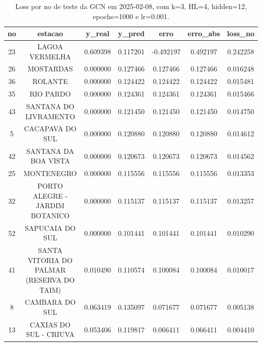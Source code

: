 \begin{table}[h]
\centering
\caption{Loss por no de teste da GCN em 2025-02-08, com k=3, HL=4, hidden=12, epochs=1000 e lr=0.001.}
\label{tab:gcn_loss_k3_hl4_h12_e1000_d20250208}
\begin{tabular}{ccccccc}
\toprule
no & estacao & y\_real & y\_pred & erro & erro\_abs & loss\_no \\
\midrule
23 & LAGOA VERMELHA & 0.609398 & 0.117201 & -0.492197 & 0.492197 & 0.242258 \\
26 & MOSTARDAS & 0.000000 & 0.127466 & 0.127466 & 0.127466 & 0.016248 \\
36 & ROLANTE & 0.000000 & 0.124422 & 0.124422 & 0.124422 & 0.015481 \\
35 & RIO PARDO & 0.000000 & 0.124361 & 0.124361 & 0.124361 & 0.015466 \\
43 & SANTANA DO LIVRAMENTO & 0.000000 & 0.121450 & 0.121450 & 0.121450 & 0.014750 \\
5 & CACAPAVA DO SUL & 0.000000 & 0.120880 & 0.120880 & 0.120880 & 0.014612 \\
42 & SANTANA DA BOA VISTA & 0.000000 & 0.120673 & 0.120673 & 0.120673 & 0.014562 \\
25 & MONTENEGRO & 0.000000 & 0.115556 & 0.115556 & 0.115556 & 0.013353 \\
32 & PORTO ALEGRE - JARDIM BOTANICO & 0.000000 & 0.115137 & 0.115137 & 0.115137 & 0.013257 \\
52 & SAPUCAIA DO SUL & 0.000000 & 0.101441 & 0.101441 & 0.101441 & 0.010290 \\
41 & SANTA VITORIA DO PALMAR (RESERVA DO TAIM) & 0.010490 & 0.110574 & 0.100084 & 0.100084 & 0.010017 \\
8 & CAMBARA DO SUL & 0.063419 & 0.135097 & 0.071677 & 0.071677 & 0.005138 \\
13 & CAXIAS DO SUL - CRIUVA & 0.053406 & 0.119817 & 0.066411 & 0.066411 & 0.004410 \\
\bottomrule
\end{tabular}
\end{table}
